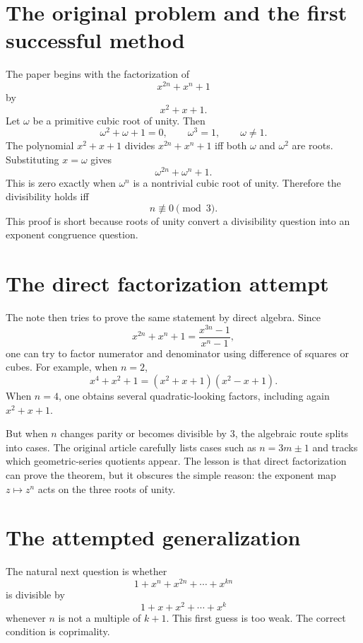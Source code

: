 
\section{The original problem and the first successful method}

The paper begins with the factorization of
\[
  x^{2n}+x^n+1
\]
by
\[
  x^2+x+1.
\]
Let $\omega$ be a primitive cubic root of unity.  Then
\[
  \omega^2+\omega+1=0,\qquad \omega^3=1,\qquad \omega\ne1.
\]
The polynomial $x^2+x+1$ divides $x^{2n}+x^n+1$ iff both $\omega$ and $\omega^2$ are roots.  Substituting $x=\omega$ gives
\[
  \omega^{2n}+\omega^n+1.
\]
This is zero exactly when $\omega^n$ is a nontrivial cubic root of unity.  Therefore the divisibility holds iff
\[
  n\not\equiv0\pmod3.
\]
This proof is short because roots of unity convert a divisibility question into an exponent congruence question.

\section{The direct factorization attempt}

The note then tries to prove the same statement by direct algebra.  Since
\[
  x^{2n}+x^n+1=\frac{x^{3n}-1}{x^n-1},
\]
one can try to factor numerator and denominator using difference of squares or cubes.  For example, when $n=2$,
\[
  x^4+x^2+1=(x^2+x+1)(x^2-x+1).
\]
When $n=4$, one obtains several quadratic-looking factors, including again $x^2+x+1$.

But when $n$ changes parity or becomes divisible by $3$, the algebraic route splits into cases.  The original article carefully lists cases such as $n=3m\pm1$ and tracks which geometric-series quotients appear.  The lesson is that direct factorization can prove the theorem, but it obscures the simple reason: the exponent map $z\mapsto z^n$ acts on the three roots of unity.

\section{The attempted generalization}

The natural next question is whether
\[
  1+x^n+x^{2n}+\cdots+x^{kn}
\]
is divisible by
\[
  1+x+x^2+\cdots+x^k
\]
whenever \(n\) is not a multiple of \(k+1\).  This first guess is too weak.  The correct condition is coprimality.

